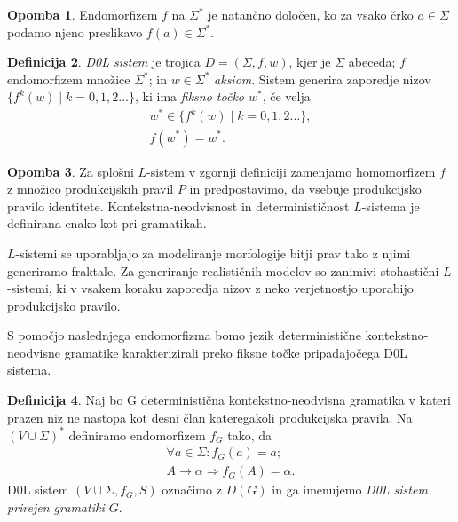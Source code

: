 \documentclass{amsart}
\theoremstyle{definition}
\newtheorem{definicija}{Definicija}[section]
\newtheorem{opomba}[definicija]{Opomba}
\theoremstyle{plain} %
\begin{document}
\begin{opomba}
    
    Endomorfizem $ f $ na $ \Sigma^* $ je natančno določen, ko za vsako črko $ a \in \Sigma $ podamo njeno preslikavo $ f(a) \in \Sigma^* $.

\end{opomba}

\begin{definicija}
    
    \textit{D0L sistem} je trojica $ D = (\Sigma, f, w) $, kjer je $ \Sigma $ abeceda; $ f $ endomorfizem množice $ \Sigma^* $;
    in $ w \in \Sigma^* $ \textit{aksiom}. Sistem generira zaporedje nizov $ \{ f^k(w) \mid k = 0, 1,2 \ldots \} $, 
    ki ima \textit{fiksno točko $ w^* $}, če velja
    \begin{gather*}
        w^* \in \{ f^k(w) \mid k = 0, 1,2 \ldots \}, \\
        f(w^*)= w^*.
    \end{gather*}

\end{definicija}

\begin{opomba}
    
    Za splošni $ L $-sistem v zgornji definiciji zamenjamo homomorfizem $ f $ z množico produkcijskih pravil $ P $ in predpostavimo,
    da vsebuje produkcijsko pravilo identitete. Kontekstna-neodvisnost in determinističnost $ L $-sistema je definirana enako kot pri gramatikah. 
    
    $ L $-sistemi se uporabljajo za modeliranje morfologije bitji prav tako z njimi generiramo fraktale. Za generiranje realističnih modelov
    so zanimivi stohastični $ L $-sistemi, ki v vsakem koraku zaporedja nizov z neko verjetnostjo uporabijo produkcijsko pravilo.

\end{opomba}

S pomočjo naslednjega endomorfizma bomo jezik deterministične kontekstno-neodvisne gramatike karakterizirali preko fiksne točke pripadajočega 
D0L sistema.

\begin{definicija}
    
    Naj bo G deterministična kontekstno-neodvisna gramatika v kateri prazen niz ne nastopa kot desni član kateregakoli
    produkcijska pravila. Na $ (V \cup \Sigma)^* $ definiramo endomorfizem $ f_G $ tako, da 
    \begin{gather*}
        \forall a \in \Sigma \colon f_G(a) = a; \\
        A \rightarrow \alpha \Rightarrow  f_G(A) = \alpha.
    \end{gather*}
    D0L sistem $ (V \cup \Sigma, f_G, S) $ označimo z $ D(G) $ in ga imenujemo \textit{D0L sistem prirejen gramatiki $G$}.

\end{definicija}
\end{document}
